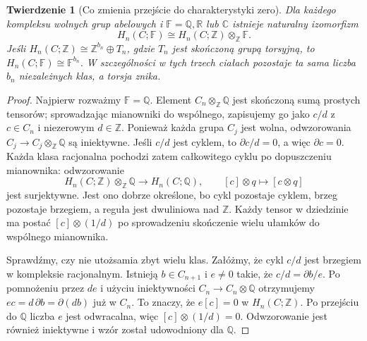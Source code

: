 \documentclass[11pt,a4paper,oneside]{report}
\newcommand{\R}{\mathbb{R}}
\newcommand{\C}{\mathbb{C}}
\newcommand{\Z}{\mathbb{Z}}
\newcommand{\Q}{\mathbb{Q}}
\theoremstyle{plain}
\newtheorem{twierdzenie}{Twierdzenie}[section]
\theoremstyle{definition}
\theoremstyle{remark}
\begin{document}
\begin{twierdzenie}[Co zmienia przejście do charakterystyki zero]
\label{thm:homologia-char-zero}
Dla każdego kompleksu wolnych grup abelowych
i $\mathbb F=\Q,\R$ lub $\C$ istnieje naturalny
izomorfizm
\begin{equation}\label{eq:homologia-char-zero}
 H_n(C;\mathbb F)
 \cong H_n(C;\Z)\otimes_{\Z}\mathbb F.
\end{equation}
Jeśli $H_n(C;\Z)\cong\Z^{b_n}\oplus T_n$,
gdzie $T_n$ jest skończoną grupą torsyjną, to
$H_n(C;\mathbb F)\cong\mathbb F^{b_n}$.
W szczególności w tych trzech ciałach
pozostaje ta sama liczba $b_n$ niezależnych
klas, a torsja znika.
\end{twierdzenie}
\begin{proof}
Najpierw rozważmy $\mathbb F=\Q$.
Element $C_n\otimes_{\Z}\Q$ jest skończoną
sumą prostych tensorów; sprowadzając
mianowniki do wspólnego, zapisujemy go jako
$c/d$ z $c\in C_n$ i niezerowym
$d\in\Z$. Ponieważ każda grupa $C_j$
jest wolna, odwzorowania
$C_j\to C_j\otimes_{\Z}\Q$ są iniektywne.
Jeśli $c/d$ jest cyklem, to
$\partial c/d=0$, a więc $\partial c=0$.
Każda klasa racjonalna pochodzi zatem
całkowitego cyklu po dopuszczeniu mianownika:
odwzorowanie
\[
 H_n(C;\Z)\otimes_{\Z}\Q\longrightarrow H_n(C;\Q),
 \qquad [c]\otimes q\longmapsto[c\otimes q]
\]
jest surjektywne. Jest ono dobrze określone,
bo cykl pozostaje cyklem, brzeg pozostaje
brzegiem, a reguła jest dwuliniowa nad $\Z$.
Każdy tensor w dziedzinie ma postać $[c]\otimes(1/d)$
po sprowadzeniu skończenie wielu ułamków do wspólnego mianownika.

Sprawdźmy, czy nie utożsamia zbyt wielu klas.
Załóżmy, że cykl $c/d$ jest brzegiem
w kompleksie racjonalnym. Istnieją
$b\in C_{n+1}$ i $e\ne0$ takie, że
$c/d=\partial b/e$. Po pomnożeniu przez
$de$ i użyciu iniektywności
$C_n\to C_n\otimes\Q$ otrzymujemy
$ec=d\,\partial b=\partial(db)$
już w $C_n$. To znaczy, że $e[c]=0$
w $H_n(C;\Z)$. Po przejściu do $\Q$
liczba $e$ jest odwracalna, więc
$[c]\otimes(1/d)=0$. Odwzorowanie jest
również iniektywne i wzór został
udowodniony dla $\Q$.


\end{proof}
\end{document}
